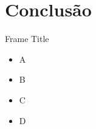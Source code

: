\section{Conclusão}

\begin{frame}{Frame Title}
    \begin{itemize}
        \item A
        \item B
        \item C 
        \item D 
    \end{itemize}
\end{frame}


